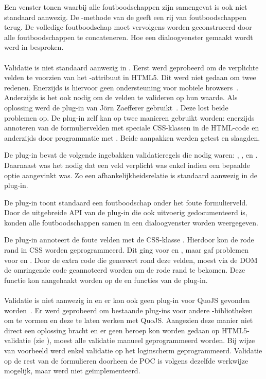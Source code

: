 Een venster tonen waarbij alle foutboodschappen zijn samengevat is ook niet standaard aanwezig.
De -methode van de  geeft een rij van foutboodschappen terug.
De volledige foutboodschap moet vervolgens worden geconstrueerd door alle foutboodschappen te concateneren.
Hoe een dialoogvenster gemaakt wordt werd in  besproken.

\paragraph{\jqm}
Validatie is niet standaard aanwezig in \jqm. 
Eerst werd geprobeerd om de verplichte velden te voorzien van het -attribuut in HTML5. 
Dit werd niet gedaan om twee redenen.
Enerzijds is hiervoor geen ondersteuning voor mobiele browsers~\cite{Deveria2013c}. 
Anderzijds is het ook nodig om de velden te valideren op hun waarde.
Als oplossing werd de plug-in van Jörn Zaefferer gebruikt~\cite{Zaefferer2013}. 
Deze lost beide problemen op.
De plug-in zelf kan op twee manieren gebruikt worden: enerzijds annoteren van de formuliervelden met speciale CSS-klassen in de HTML-code en anderzijds door programmatie met \js{}. 
Beide aanpakken werden getest en slaagden. 

De plug-in bevat de volgende ingebakken validatieregels die nodig waren: , ,  en .
Daarnaast was het nodig dat een veld verplicht was enkel indien een bepaalde optie aangevinkt was.
Zo een afhankelijkheidsrelatie is standaard aanwezig in de plug-in.

De plug-in toont standaard een foutboodschap onder het foute formulierveld.
Door de uitgebreide API van de plug-in die ook uitvoerig gedocumenteerd is, konden alle foutboodschappen samen in een dialoogvenster worden weergegeven.

De plug-in annoteert de foute velden met de CSS-klasse .
Hierdoor kon de rode rand in CSS worden geprogrammeerd. 
Dit ging voor  en , maar gaf problemen voor  en .
Door de extra code die \jqm{} genereert rond deze velden, moest via de DOM de omringende code geannoteerd worden om de rode rand te bekomen. 
Deze functie kon aangehaakt worden op de  en  functies van de plug-in.

\paragraph{\lungo}
Validatie is niet aanwezig in \lungo{} en er kon ook geen plug-in voor QuoJS gevonden worden~\cite{Ameye2013}.
Er werd geprobeerd om bestaande plug-ins voor andere \js{}-bibliotheken om te vormen en deze te laten werken met QuoJS.
Aangezien deze manier niet direct een oplossing bracht en er geen beroep kon worden gedaan op HTML5-validatie (zie \jqm{}), moest alle validatie manueel geprogrammeerd worden. 
Bij wijze van voorbeeld werd enkel validatie op het loginscherm geprogrammeerd.
Validatie op de rest van de formulieren doorheen de POC is volgens dezelfde werkwijze mogelijk, maar werd niet geïmplementeerd.


